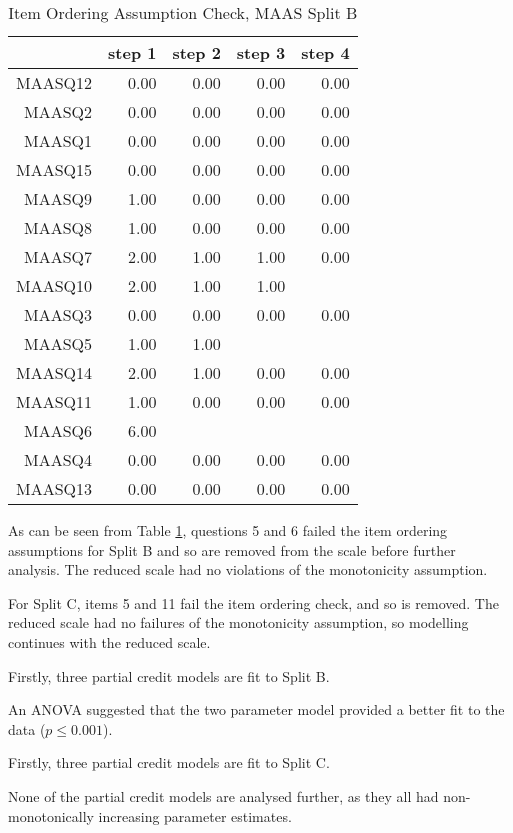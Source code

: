 \documentclass{article}
\begin{document}
\begin{table}[ht]
\centering
\begin{tabular}{rrrrr}
  \hline
 & step 1 & step 2 & step 3 & step 4 \\ 
  \hline
MAASQ12 & 0.00 & 0.00 & 0.00 & 0.00 \\ 
  MAASQ2 & 0.00 & 0.00 & 0.00 & 0.00 \\ 
  MAASQ1 & 0.00 & 0.00 & 0.00 & 0.00 \\ 
  MAASQ15 & 0.00 & 0.00 & 0.00 & 0.00 \\ 
  MAASQ9 & 1.00 & 0.00 & 0.00 & 0.00 \\ 
  MAASQ8 & 1.00 & 0.00 & 0.00 & 0.00 \\ 
  MAASQ7 & 2.00 & 1.00 & 1.00 & 0.00 \\ 
  MAASQ10 & 2.00 & 1.00 & 1.00 &  \\ 
  MAASQ3 & 0.00 & 0.00 & 0.00 & 0.00 \\ 
  MAASQ5 & 1.00 & 1.00 &  &  \\ 
  MAASQ14 & 2.00 & 1.00 & 0.00 & 0.00 \\ 
  MAASQ11 & 1.00 & 0.00 & 0.00 & 0.00 \\ 
  MAASQ6 & 6.00 &  &  &  \\ 
  MAASQ4 & 0.00 & 0.00 & 0.00 & 0.00 \\ 
  MAASQ13 & 0.00 & 0.00 & 0.00 & 0.00 \\ 
   \hline
\end{tabular}
\caption{Item Ordering Assumption Check, MAAS Split B} 
\label{tab:maas2bitemord}
\end{table}
As can be seen from Table \ref{tab:maas2bitemord}, questions 5 and 6 failed the item ordering assumptions for Split B and so are removed from the scale before further analysis. The reduced scale had no violations of the monotonicity assumption. 


For Split C, items 5 and 11 fail the item ordering check, and so is removed. The reduced scale had no failures of the monotonicity assumption, so modelling continues with the reduced scale. 

Firstly, three partial credit models are fit to Split B.


An ANOVA suggested that the two parameter model provided a better fit to the data ($p\le 0.001$). 

Firstly, three partial credit models are fit to Split C. 


None of the partial credit models are analysed further, as they all had non-monotonically increasing parameter estimates. 
\end{document}

